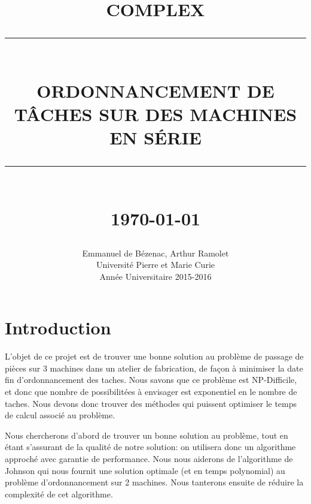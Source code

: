 \documentclass[12pt]{article}
\newcommand{\HRule}[1]{\rule{\linewidth}{#1}}
\begin{document}
\title{ \normalsize \textsc{COMPLEX}
		\\ [2.0cm]
		\HRule{0.5pt} \\
		\LARGE \textbf{\uppercase{Ordonnancement de tâches sur des machines en série}}
		\HRule{2pt} \\ [0.5cm]
		\normalsize \today \vspace*{5\baselineskip}}

\date{}

\author{
		Emmanuel de Bézenac, Arthur Ramolet \\ 
		Université Pierre et Marie Curie \\
		Année Universitaire 2015-2016 }

\maketitle

\newpage
\tableofcontents

\newpage
\sectionfont{\scshape}


\clearpage
\newpage
\section{Introduction}

L'objet de ce projet est de trouver une bonne solution au problème de passage de pièces sur 3 machines dans un atelier de fabrication, de façon à minimiser la date fin d'ordonnancement des taches. Nous savons que ce problème est NP-Difficile, et donc que nombre de possibilitées à envisager est exponentiel en le nombre de taches. Nous devons donc trouver des méthodes qui puissent optimiser le temps de calcul associé au problème.

Nous chercherons d'abord de trouver un bonne solution au problème, tout en étant s'assurant de la qualité de notre solution: on utilisera donc un algorithme approché avec garantie de performance. Nous nous aiderons de l'algorithme de Johnson qui nous fournit une solution optimale (et en temps polynomial) au problème d'ordonnancement sur 2 machines. Nous tanterons ensuite de réduire la complexité de cet algorithme.
\end{document}
